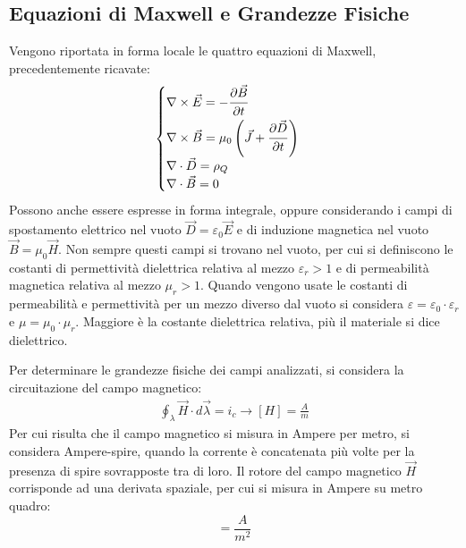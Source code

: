 \documentclass{article}
\numberwithin{equation}{subsection}
\begin{document}
\subsection{Equazioni di Maxwell e Grandezze Fisiche}

Vengono riportata in forma locale le quattro equazioni di Maxwell, precedentemente ricavate:
\begin{equation*}
    \begin{cases}
        \nabla\times\vec{E}=-\displaystyle\frac{\strut \partial \vec{B}}{\strut \partial t}\\
        \nabla\times\vec{B}=\mu_0\left(\vec{J}+\displaystyle\frac{\strut \partial \vec{D}}{\strut \partial t}\right)\\
        \nabla\cdot\vec{D}=\rho_Q\\
        \nabla\cdot\vec{B}=0
    \end{cases}
\end{equation*}
Possono anche essere espresse in forma integrale, oppure considerando i campi di spostamento elettrico nel vuoto $\vec{D}=\varepsilon_0\vec{E}$ e di induzione magnetica nel 
vuoto $\vec{B}=\mu_0\vec{H}$. Non sempre questi campi si trovano nel vuoto, per cui si definiscono le costanti di permettività dielettrica relativa al mezzo $\varepsilon_r>1$ 
e di permeabilità magnetica relativa al mezzo $\mu_r>1$. Quando vengono usate le costanti di permeabilità e permettività per un mezzo diverso dal vuoto si considera $\varepsilon=\varepsilon_0\cdot\varepsilon_r$ 
e $\mu=\mu_0\cdot\mu_r$. Maggiore è la costante dielettrica relativa, più il materiale si dice dielettrico. 

Per determinare le grandezze fisiche dei campi analizzati, si considera la circuitazione del campo magnetico:
\begin{gather*}
    \displaystyle\oint_{\lambda}\vec{H}\cdot d\vec{\lambda}=i_c\to[H]=\displaystyle\frac{A}{m}
\end{gather*}
Per cui risulta che il campo magnetico si misura in Ampere per 
metro, si considera Ampere-spire, quando la corrente è concatenata più volte per la presenza di spire sovrapposte tra di loro. Il rotore del campo magnetico $\vec{H}$ 
corrisponde ad una derivata spaziale, per cui si misura in Ampere su metro quadro:
\begin{equation*}
    [\nabla\times\vec{H}]=\displaystyle\frac{A}{m^2}
\end{equation*}
\end{document}

